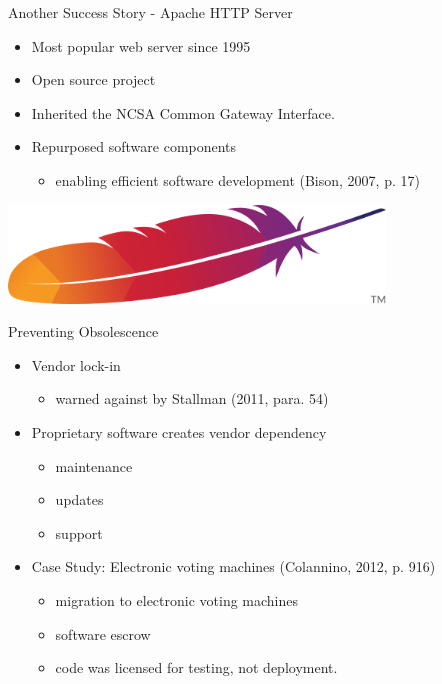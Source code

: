 

\begin{frame}{Another Success Story - Apache HTTP Server}
\begin{minipage}{0.5\textwidth}
\begin{itemize}
  \item Most popular web server since 1995
  \item Open source project
  \item Inherited the NCSA Common Gateway Interface.
  \item Repurposed software components
    \begin{itemize}
    \item enabling efficient software development (Bison, 2007, p. 17)
    \end{itemize}
\end{itemize}
\end{minipage}
\begin{minipage}{0.45\textwidth}
\includegraphics[width = 0.75\textwidth]{apache.png}
\end{minipage}
\end{frame}

 
 

\begin{frame}{Preventing Obsolescence}
\begin{itemize}
  
  \item Vendor lock-in
    \begin{itemize}
      \item warned against by Stallman (2011, para. 54)
    \end{itemize}
  \item Proprietary software creates vendor dependency 
    \begin{itemize}
      \item maintenance
      \item updates
      \item support
    \end{itemize}
  \item Case Study: Electronic voting machines (Colannino, 2012, p. 916)
    \begin{itemize}
      \item migration to electronic voting machines
      \item software escrow
      \item code was licensed for testing, not deployment. 
    \end{itemize}
\end{itemize}
\end{frame} 


